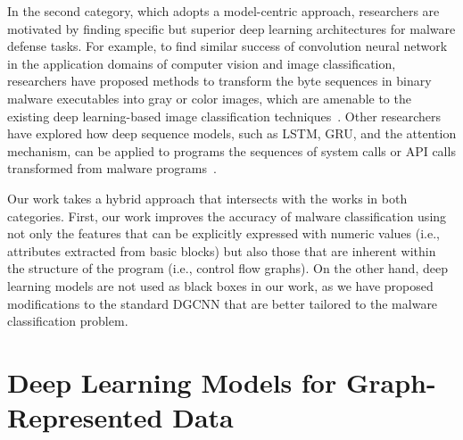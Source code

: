In the second category, which adopts a model-centric approach, researchers are motivated by finding specific but superior deep learning architectures for malware defense tasks.
For example, to find similar success of convolution neural network in the application domains of computer vision and image classification, researchers have proposed methods to transform the byte sequences in binary malware executables into gray or color images, which are amenable to the existing deep learning-based image classification techniques~\cite{R2D2, GibertCnn}. Other researchers have explored how deep sequence models, such as LSTM, GRU, and the attention mechanism, can be applied to programs the sequences of system calls or API calls transformed from malware programs~\cite{LstmSyscall,MalwareLstmGru}. 

Our work takes a hybrid approach that intersects with the works in both categories. First, our work improves the accuracy of malware classification using not only the features that can be explicitly expressed with numeric values (i.e., attributes extracted from basic blocks) but also those that are inherent within the structure of the program (i.e., control flow graphs). On the other hand, deep learning models are not used as black boxes in our work, as we have proposed modifications to the standard DGCNN that are better tailored to the malware classification problem.

\section{Deep Learning Models for Graph-Represented Data}

